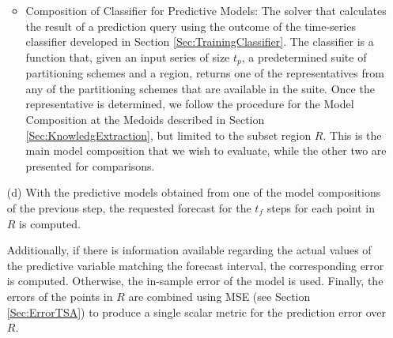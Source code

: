 \begin{itemize}
\begin{itemize}
	\item Composition of Classifier for Predictive Models: The solver that calculates the result of a prediction query using the outcome of the time-series classifier developed in Section \ref{Sec:TrainingClassifier}. The classifier is a function that, given an input series of size $t_p$, a predetermined suite of partitioning schemes and a region, returns one of the representatives from any of the partitioning schemes that are available in the suite. Once the representative is determined, we follow the procedure for the Model Composition at the Medoids described in Section \ref{Sec:KnowledgExtraction}, but limited to the subset region $R$. This is the main model composition that we wish to evaluate, while the other two are presented for comparisons.
    \end{itemize}
    \item [(d)] With the predictive models obtained from one of the model compositions of the previous step, the requested forecast for the $t_{f}$ steps for each point in $R$ is computed. 
    
    Additionally, if there is information available regarding the actual values of the predictive variable matching the forecast interval, the corresponding error is computed. Otherwise, the in-sample error of the model is used. Finally, the errors of the points in $R$ are combined using MSE (see Section \ref{Sec:ErrorTSA}) to produce a single scalar metric for the prediction error over $R$.
\end{itemize}


